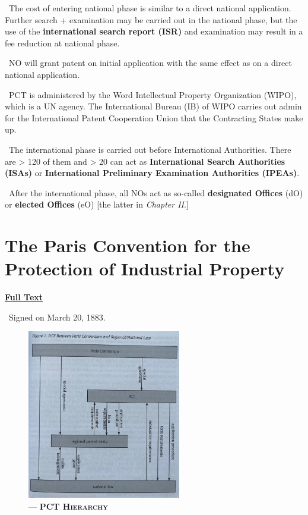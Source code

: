 \documentclass{report}
\newcommand{\n}{\newline}
\newcommand{\p}{\adforn{61} \ }
\begin{document}
\p The cost of entering national phase is similar to a direct national application. Further search + examination may be carried out in the national phase, but the use of the \textbf{international search report (ISR)} and examination may result in a fee reduction at national phase. \n

\p NO will grant patent on initial application with the same effect as on a direct national application. \n

\p PCT is administered by the Word Intellectual Property Organization (WIPO), which is a UN agency. The International Bureau (IB) of WIPO carries out admin for the International Patent Cooperation Union that the Contracting States make up. \n

\p The international phase is carried out before International Authorities. There are > 120 of them and > 20 can act as \textbf{International Search Authorities (ISAs)} or \textbf{International Preliminary Examination Authorities (IPEAs)}.  \n

\p After the international phase, all NOs act as so-called \textbf{designated Offices} (dO) or \textbf{elected Offices} (eO) [the latter in \textit{Chapter II}.]

\section{The Paris Convention for the Protection of Industrial Property}

\begin{center}
 \href{https://en.wikisource.org/wiki/Paris_Convention_for_the_Protection_of_Industrial_Property_(1883)}{\textbf{Full Text}}

\end{center}


\p Signed on March 20, 1883. \n

\begin{figure}[htbp] %
  \centering
  \includegraphics[width=0.6\textwidth]{images/Fig_1.jpg} %
  \caption{--- \textbf{\textsc{PCT Hierarchy}}}
\end{figure}
\end{document}
